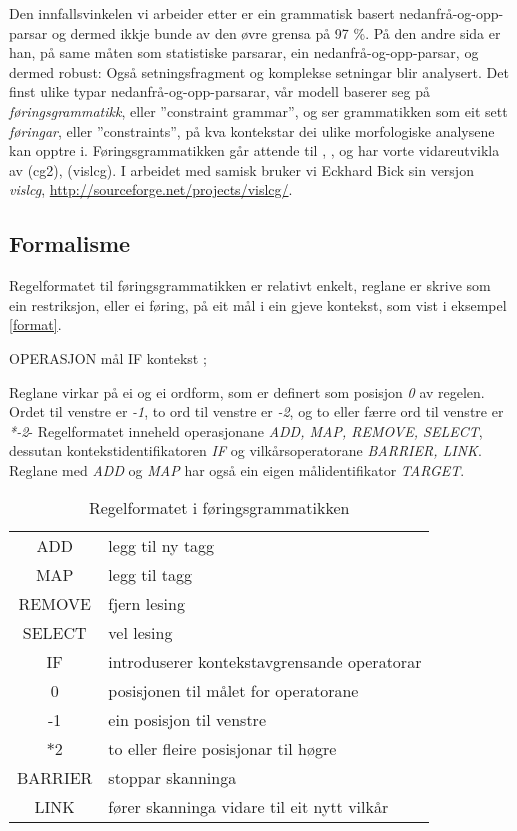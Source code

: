 \documentclass[a4paper,norsk]{article}
\begin{document}
Den innfallsvinkelen vi arbeider etter er ein grammatisk basert nedanfrå-og-opp-parsar og dermed ikkje bunde av den øvre grensa på 97 \%. På den andre sida er han, på same måten som statistiske parsarar, ein nedanfrå-og-opp-parsar, og dermed robust: Også setningsfragment og komplekse setningar blir analysert. Det finst ulike typar nedanfrå-og-opp-parsarar, vår modell baserer seg på \emph{føringsgrammatikk}, eller ''constraint grammar'', og ser grammatikken som eit sett \emph{føringar}, eller ''constraints'', på kva kontekstar dei ulike morfologiske analysene kan opptre i. Føringsgrammatikken går attende til \citet{Karlsson90}, \citet{Karlsson95}, og har vorte vidareutvikla av \citet{Tapanainen96} (cg2), \citet{Bick00} (vislcg). I arbeidet med samisk bruker vi Eckhard Bick sin versjon \emph{vislcg}, \url{http://sourceforge.net/projects/vislcg/}.%

\subsection{Formalisme}

Regelformatet til føringsgrammatikken er relativt enkelt, reglane er skrive som ein restriksjon, eller ei føring, på eit mål i ein gjeve kontekst, som vist i eksempel \ref{format}. %

\begin{example}\label{format}
OPERASJON mål IF kontekst ;
\end{example}

Reglane virkar på ei og ei ordform, som er definert som posisjon \emph{0} av regelen. Ordet til venstre er \emph{-1}, to ord til venstre er \emph{-2}, og to eller færre ord til venstre er \emph{*-2}- Regelformatet inneheld operasjonane \emph{ADD, MAP, REMOVE, SELECT}, dessutan kontekstidentifikatoren \emph{IF} og vilkårsoperatorane \emph{BARRIER, LINK}. Reglane med \emph{ADD} og \emph{MAP} har også ein eigen målidentifikator \emph{TARGET}.%

\begin{table}[htdp]
\caption{Regelformatet i føringsgrammatikken}
\begin{center}
\begin{tabular}{|c|l|}
\hline
 ADD & legg til ny tagg \\
 MAP & legg til tagg \\
 REMOVE & fjern lesing \\
 SELECT & vel lesing \\
\hline 
 IF & introduserer kontekstavgrensande operatorar \\
\hline 
 0 & posisjonen til målet for operatorane \\
 -1 & ein posisjon til venstre \\
 $\ast2$ & to eller fleire posisjonar til høgre \\
\hline 
 BARRIER & stoppar skanninga \\
 LINK & fører skanninga vidare til eit nytt vilkår \\
\hline 
\end{tabular}
\end{center}
\label{default}
\end{table}%
\end{document}
